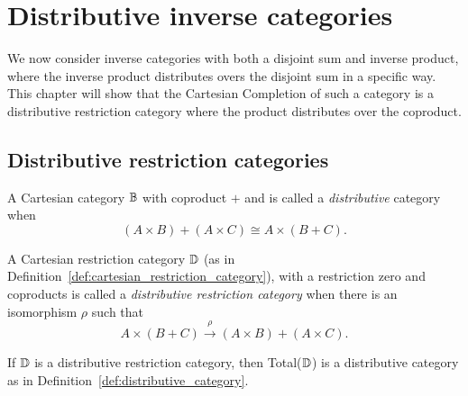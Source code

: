 
\chapter{Distributive inverse categories} %
\label{chap:distributive_inverse_categories}
We now consider inverse categories with both a disjoint sum and inverse product, where the inverse
product distributes overs the disjoint sum in a specific way. This chapter will show that the
Cartesian Completion of such a category is a distributive restriction category where the product
distributes over the coproduct.

\section{Distributive restriction categories} %
\label{sec:distributive_restriction_categories}

\begin{definition}\label{def:distributive_category}
  A Cartesian category $\mathbb{B}$ with coproduct $+$ and is called a
  \emph{distributive}\cite{cockett1993-introduction-distributive} category when
  \[
    (A\times B) + (A\times C) \cong A \times (B+ C).
  \]
\end{definition}

\begin{definition}\label{def:distributive_restriction_category}
  A Cartesian restriction category $\mathbb{D}$ (as in Definition~\ref{def:cartesian_restriction_category}),
  with a restriction zero and coproducts is called a
  \emph{distributive restriction category}\cite{cockettlack2004:restcategories3}
  when there is an isomorphism $\rho$ such that
  \[
    A\times (B+C) \xrightarrow{\rho} (A\times B) +(A\times C).
  \]
\end{definition}

If $\mathbb{D}$ is a distributive restriction category, then Total($\mathbb{D}$) is a distributive
category as in Definition~\ref{def:distributive_category}.


